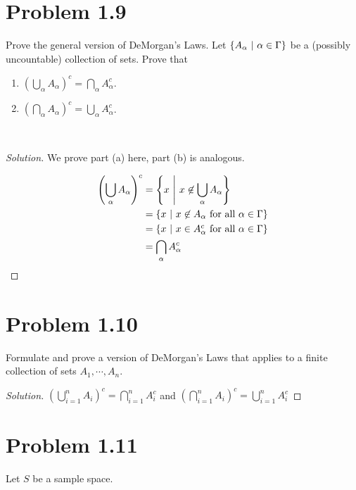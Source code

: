 \documentclass[12pt,letterpaper,reqno]{amsart}
\numberwithin{equation}{subsection}
\begin{document}
\newpage
\section{Problem 1.9}
Prove the general version of DeMorgan's Laws. Let $\left\{ {A_{\alpha}} \ \middle| \ {\alpha \in \Gamma} \right\}$ be a (possibly uncountable) collection of sets. Prove that

\begin{enumerate}[label=(\alph*),leftmargin=*]
    \item  $\left( \bigcup_{\alpha} A_{\alpha} \right)^c = \bigcap_{\alpha} A^c_{\alpha}$.
    
    \item $\left( \bigcap_{\alpha} A_{\alpha} \right)^c = \bigcup_{\alpha} A^c_{\alpha}$.
\end{enumerate}~\\

\begin{proof}[Solution] We prove part (a) here, part (b) is analogous.

\begin{align*}
    \left( \bigcup_{\alpha} A_{\alpha} \right)^c &= \left\{ {x} \ \middle| \ {x \not\in \bigcup_{\alpha} A_{\alpha}} \right\} \\
    &= \left\{ {x} \ \middle| \ {\mbox{$x \not\in A_{\alpha}$ for all $\alpha \in \Gamma$}} \right\} \\
    &= \left\{ {x} \ \middle| \ {\mbox{$x \in A_{\alpha}^c$ for all $\alpha \in \Gamma$}} \right\} \\
    &= \bigcap_{\alpha} A_{\alpha}^c
\end{align*}
\end{proof}

\newpage
\section{Problem 1.10}

Formulate and prove a version of DeMorgan's Laws that applies to a finite collection of sets $A_1, \cdots, A_n$.

\begin{proof}[Solution]
$\left( \bigcup_{i=1}^n A_i \right)^c = \bigcap_{i=1}^n A_i^c$ and $\left( \bigcap_{i=1}^n A_i \right)^c = \bigcup_{i=1}^n A_i^c$
\end{proof}

\newpage
\section{Problem 1.11}

Let $S$ be a sample space.
\end{document}
